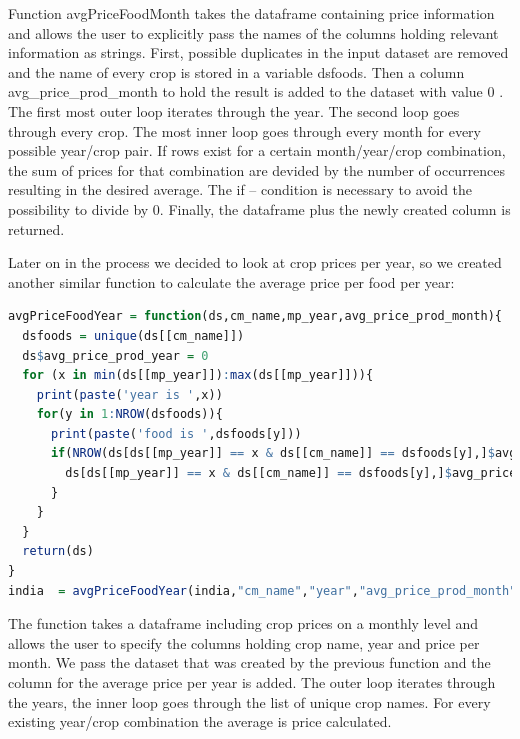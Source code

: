 \documentclass[12pt,a4paper,english]{article}
\begin{document}
Function avgPriceFoodMonth takes the dataframe containing price information and allows the user to explicitly pass the names of the columns holding relevant information as strings.
First, possible duplicates in the input dataset are removed and the name of every crop is stored in a variable dsfoods. Then a column avg\_price\_prod\_month to hold the result is added to the dataset with value 0 .
The first most outer loop iterates through the year. The second loop goes through every crop. The most inner loop goes through every month for every possible year/crop pair. If rows exist for a certain month/year/crop combination, the sum of prices for that combination are devided by the number of occurrences resulting in the desired average. The if – condition is necessary to avoid the possibility to divide by 0. Finally, the dataframe plus the newly created column is returned.

Later on in the process we decided to look at crop prices per year, so we created another similar function to calculate the average price per food per year:

\begin{lstlisting}[language= R, captionpos=b,caption=\href{https://github.com/jaidikam/sps_ws1718/tree/master/Qfolder2}{SPL\_Q2\_india\_preparation}]
avgPriceFoodYear = function(ds,cm_name,mp_year,avg_price_prod_month){
  dsfoods = unique(ds[[cm_name]]) 
  ds$avg_price_prod_year = 0
  for (x in min(ds[[mp_year]]):max(ds[[mp_year]])){
    print(paste('year is ',x))
    for(y in 1:NROW(dsfoods)){
      print(paste('food is ',dsfoods[y]))
      if(NROW(ds[ds[[mp_year]] == x & ds[[cm_name]] == dsfoods[y],]$avg_price_prod_year) > 0){
        ds[ds[[mp_year]] == x & ds[[cm_name]] == dsfoods[y],]$avg_price_prod_year = sum(ds[ds[[mp_year]] == x & ds[[cm_name]] == dsfoods[y],][[avg_price_prod_month]]) / NROW(ds[ds[[mp_year]] == x & ds[[cm_name]] == dsfoods[y],][[avg_price_prod_month]])
      }
    }
  }
  return(ds)
}
india  = avgPriceFoodYear(india,"cm_name","year","avg_price_prod_month")
\end{lstlisting}

The function takes a dataframe including crop prices on a monthly level and allows the user to specify the columns holding crop name, year and price per month.
We pass the dataset that was created by the previous function and the column for the average price per year is added. The outer loop iterates through the years, the inner loop goes through the list of unique crop names. For every existing year/crop combination the average is price calculated.
\end{document}
